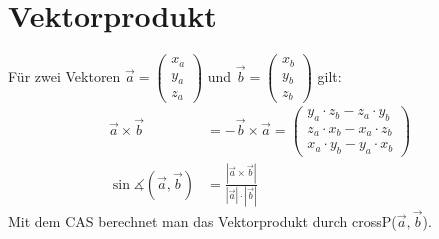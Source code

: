\section{Vektorprodukt}
Für zwei Vektoren $\overrightarrow{a}=\left(\begin{array}{c}x_a\\ y_a\\ z_a\end{array}\right)$ und $\overrightarrow{b}=\left(\begin{array}{c}x_b\\ y_b\\ z_b\end{array}\right)$ gilt:
\begin{align}
  \overrightarrow{a}\times\overrightarrow{b}
  &=-\overrightarrow{b}\times\overrightarrow{a}
  =\left(\begin{array}{c}
    y_a \cdot z_b - z_a \cdot y_b \\
    z_a \cdot x_b - x_a \cdot z_b \\
    x_a \cdot y_b - y_a \cdot x_b
  \end{array}\right) \\
  \sin\measuredangle(\overrightarrow{a},\overrightarrow{b})
  &= \frac{|\overrightarrow{a}\times\overrightarrow{b}|}{|\overrightarrow{a}|\cdot|\overrightarrow{b}|}
\end{align}
Mit dem CAS berechnet man das Vektorprodukt durch \glqq crossP($\overrightarrow{a},\overrightarrow{b}$)\grqq.
